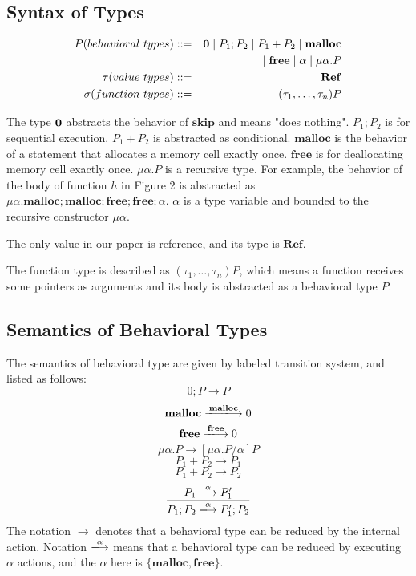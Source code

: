 \documentclass[english]{jssst_ppl} %
\newcommand\tB{\;|\;}
\newcommand\SKIP{\mathbf{skip}}
\newcommand\Malloc{\mathbf{malloc}}
\newcommand\Free{\mathbf{free}}
\begin{document}
\subsection{Syntax of Types}
     \begin{eqnarray*}
       P (behavioral \ types)::=&& {\bf 0} \tB P_{1};P_{2} \tB P_{1}+P_{2} \tB \Malloc\\
       &&\tB \Free \tB \alpha \tB \mu\alpha.P \\
       \tau (value \ types)::=&&    \mathbf{Ref}  \\ %
       \sigma (function \ types)::=&& (\tau_{1},\dots, \tau_{n}) P
     \end{eqnarray*}

The type $\bf 0$ abstracts the behavior of $\SKIP$ and means "does nothing". $P_{1};P_{2}$ is for sequential execution. $P_{1} + P_{2}$ is abstracted as conditional. $\Malloc$ is the behavior of a statement that allocates a memory cell exactly once. $\Free$ is for deallocating memory cell exactly once. $\mu \alpha. P$ is a recursive type. For example, the behavior of  the body of function $h$ in Figure 2 is abstracted as $\mu \alpha. \Malloc;\Malloc;\Free;\Free;\alpha$. $\alpha$ is a type variable and bounded to the recursive constructor $\mu \alpha$.

The only value in our paper is reference, and its type is $\mathbf{Ref}$.

The function type is described as $(\tau_{1}, \dots, \tau_{n})P$, which means a function receives some pointers as arguments and its body is abstracted as a behavioral type $P$.

\subsection{Semantics of Behavioral Types}
The semantics of behavioral type are given by labeled transition system, and listed as follows:
    $$
         0;P \rightarrow P
    $$
    $$
          \Malloc \xlongrightarrow{\Malloc} 0
    $$
    $$
           \Free \xlongrightarrow{\Free} 0
    $$
    $$
          \mu \alpha.P \rightarrow  [\mu \alpha . P/\alpha]  P
    $$
   $$
          P_{1} + P_{2} \longrightarrow P_{1}
   $$
   $$
          P_{1} + P_{2} \longrightarrow P_{2}
   $$
   $$
           \frac{P_{1} \xlongrightarrow{\alpha} P_{1}' }
                 {P_{1};P_{2} \xlongrightarrow{\alpha} P_{1}';P_{2}}
   $$
The notation $\rightarrow$ denotes that a behavioral type can be reduced by the internal action. Notation $\xlongrightarrow{\alpha}$ means that a behavioral type can be reduced by executing $\alpha$ actions, and the $\alpha$ here is $\{\Malloc, \Free\}$.
\end{document}
